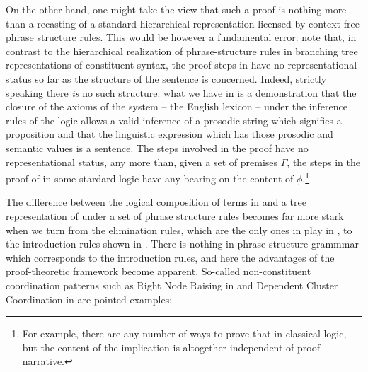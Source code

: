 \documentclass[output=paper,colorlinks,citecolor=brown]{langscibook}
\begin{document}
On the other hand, one might take the view that such a proof is
nothing more than a recasting of a standard hierarchical
representation licensed by context-free phrase structure rules. This
would be however a fundamental error: note that, in contrast to the
hierarchical realization of phrase-structure rules in branching tree
representations of constituent syntax, the proof steps in 
have no representational status so far as the structure of the
sentence is concerned. Indeed, strictly speaking there \textit{is} no
such structure: what we have in  is a demonstration that
the closure of the axioms of the system -- the English lexicon -- under
the inference rules of the logic allows a valid inference of a prosodic
string
 
which signifies a proposition
 and that the
linguistic expression which has those prosodic and semantic values is
a sentence. The steps involved in the proof have no representational
status, any more than, given a set of premises $\Gamma$, the steps in
the proof of \sem{ \Gamma  \ensuremath{\vdash\xspace } \phi } in some stardard logic have any
bearing on the content of $\phi$.\footnote{For example, there are any
number of ways to prove that \sem{  \ensuremath{\vdash\xspace } \phi\supset(\neg\phi\supset\psi) }
in classical logic, but the content of the implication is
altogether independent of proof narrative.}

The difference between the logical composition of terms in  and
a tree representation of  under a set of phrase structure rules
becomes far more stark when we turn from the elimination rules, which
are the only ones in play in , to the introduction rules
shown in . There is nothing in phrase structure grammmar which
corresponds to the introduction rules, and here the advantages of the
proof-theoretic framework become apparent. So-called non-constituent
coordination patterns such as Right Node Raising in  and
Dependent Cluster Coordination in  are pointed examples:
\end{document}
